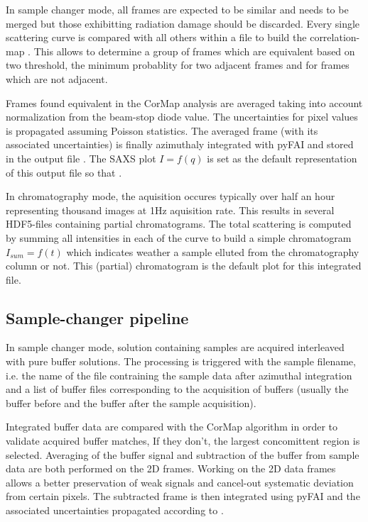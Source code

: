\documentclass[preprint]{iucr}              %
\begin{document}
In sample changer mode, all frames are expected to be similar and needs to be merged but those exhibitting radiation damage should be discarded.
Every single scattering curve is compared with all others within a file to build the correlation-map \cite{cormap}. 
This allows to determine a group of frames which are equivalent based on two threshold, the minimum probablity for two adjacent frames 
and for frames which are not adjacent. 

Frames found equivalent in the CorMap analysis are averaged taking into account normalization from the beam-stop diode value. 
The uncertainties for pixel values is propagated assuming Poisson statistics. 
The averaged frame (with its associated uncertainties) is finally azimuthaly integrated with pyFAI and stored in the output file . 
The SAXS plot $I = f(q)$ is set as the default representation of this output file so that .

In chromatography mode, the aquisition occures typically over half an hour representing thousand images at 1Hz aquisition rate. 
This results in several HDF5-files containing partial chromatograms.
The total scattering is computed by summing all intensities in each of the curve to build a simple chromatogram $I_{sum} = f(t)$ 
which indicates weather a sample elluted from the chromatography column or not. 
This (partial) chromatogram is the default plot for this integrated file.  

\subsection{Sample-changer pipeline}
In sample changer mode, solution containing samples are acquired interleaved with pure buffer solutions.
The processing is triggered with the sample filename, i.e. the name of the file contraining the sample data after azimuthal integration and a list of 
buffer files corresponding to the acquisition of buffers (usually the buffer before and the buffer after the sample acquisition). 

Integrated buffer data are compared with the CorMap algorithm in order to validate acquired buffer matches, 
If they don't, the largest concomittent region is selected. 
Averaging of the buffer signal and subtraction of the buffer from sample data are both performed on the 
2D frames. 
Working on the 2D data frames allows a better preservation of weak signals and cancel-out systematic deviation
from certain pixels.
The subtracted frame is then integrated using pyFAI and the associated uncertainties propagated according to \cite{pyfai_2020}.
\end{document}
